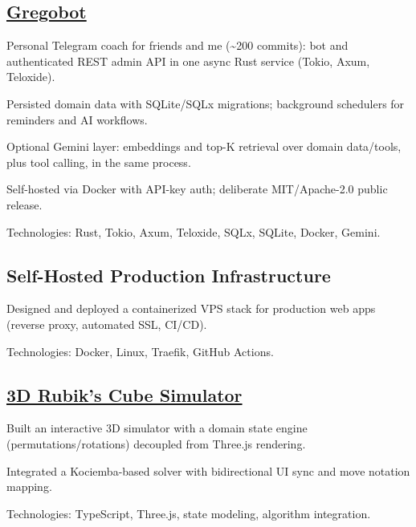 \subsection{\href{https://github.com/Wuraim/gregobot-oss}{Gregobot}}

\begin{zitemize}
    \item Personal Telegram coach for friends and me (\textasciitilde200 commits): bot and authenticated REST admin API in one async Rust service (Tokio, Axum, Teloxide).
    \item Persisted domain data with SQLite/SQLx migrations; background schedulers for reminders and AI workflows.
    \item Optional Gemini layer: embeddings and top-K retrieval over domain data/tools, plus tool calling, in the same process.
    \item Self-hosted via Docker with API-key auth; deliberate MIT/Apache-2.0 public release.
    \item Technologies: Rust, Tokio, Axum, Teloxide, SQLx, SQLite, Docker, Gemini.
\end{zitemize}

\vspace{6pt}

\subsection{{Self-Hosted Production Infrastructure}}

\begin{zitemize}
    \item Designed and deployed a containerized VPS stack for production web apps (reverse proxy, automated SSL, CI/CD).
    \item Technologies: Docker, Linux, Traefik, GitHub Actions.
\end{zitemize}

\vspace{6pt}

\subsection{\href{https://rubikscube.gregoirelorgnier.me/}{3D Rubik’s Cube Simulator}}

\begin{zitemize}
    \item Built an interactive 3D simulator with a domain state engine (permutations/rotations) decoupled from Three.js rendering.
    \item Integrated a Kociemba-based solver with bidirectional UI sync and move notation mapping.
    \item Technologies: TypeScript, Three.js, state modeling, algorithm integration.
\end{zitemize}
